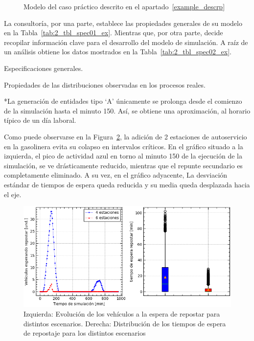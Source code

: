 \begin{figure}
	\begin{center}
		
	\end{center}
	\caption{Modelo del caso práctico descrito en el apartado~\ref{example_descrp}}
		\label{fig:2_fc_complex_ex}
\end{figure}

La consultoría, por una parte, establece
las propiedades generales de su modelo en la Tabla~\ref{tab:2_tbl_spec01_ex}.
Mientras que, por otra parte, decide recopilar información clave
para el desarrollo del modelo de simulación.
A raíz de un análisis obtiene los datos mostrados en la Tabla~\ref{tab:2_tbl_spec02_ex}.

\begin{table}
	\centering
	\caption{Especificaciones generales.}
	
	\label{tab:2_tbl_spec01_ex}
\end{table}
	
\begin{table}
	\centering
	\caption{Propiedades de las distribuciones observadas en los procesos reales.}
	
	\footnotesize{*La generación de entidades tipo `A' únicamente
		se prolonga desde el comienzo de la simulación hasta el minuto 150.
	Así, se obtiene una aproximación, al horario típico de un día laboral.}
	\label{tab:2_tbl_spec02_ex}
\end{table}

Como puede observarse en la Figura~\ref{fig:2_fig_example_01},
la adición de 2 estaciones de autoservicio en la gasolinera
evita su colapso en intervalos críticos.
En el gráfico situado a la izquierda,
el pico de actividad azul
en torno al minuto 150 de la ejecución de la simulación,
se ve drásticamente reducido,
mientras que el repunte secundario es completamente eliminado.
A su vez, en el gráfico adyacente,
La desviación estándar de tiempos de espera queda reducida
y su media queda desplazada hacia el eje.

\begin{figure}
	\begin{center}
		\includegraphics[width=\textwidth]{fig/2_fig_example_01}
	\end{center}
	\caption{Izquierda: Evolución de los vehículos a la espera de repostar para distintos escenarios. Derecha: Distribución de los tiempos de espera de repostaje para los distintos escenarios}
	\label{fig:2_fig_example_01}
\end{figure}

